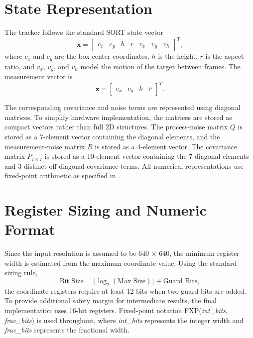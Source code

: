 \section{State Representation}
The tracker follows the standard SORT state vector
\begin{equation}
	\mathbf{x} = \begin{bmatrix}
		c_x & c_y & h & r & v_x & v_y & v_h
	\end{bmatrix}^{T},
\end{equation}
where \(c_x\) and \(c_y\) are the box center coordinates, \(h\) is the height, \(r\) is 
the aspect ratio, and \(v_x\), \(v_y\), and \(v_h\) model the motion of the target between 
frames. The measurement vector is
\begin{equation}
	\mathbf{z} = \begin{bmatrix}
		c_x & c_y & h & r
	\end{bmatrix}^{T}.
\end{equation}

The corresponding covariance and noise terms are represented using diagonal 
matrices. To simplify hardware implementation, the matrices are stored as compact 
vectors rather than full 2D structures. The process-noise matrix \(Q\) is stored as 
a 7-element vector containing the diagonal elements, and the measurement-noise matrix 
\(R\) is stored as a 4-element vector. The covariance matrix \(P_{7 \times 7}\) is stored 
as a 10-element vector containing the 7 diagonal elements and 3 distinct off-diagonal 
covariance terms. All numerical representations use fixed-point arithmetic as specified 
in .

\section{Register Sizing and Numeric Format}
\label{sec:register_sizing}
Since the input resolution is assumed to be 640 \(\times\) 640, the minimum register 
width is estimated from the maximum coordinate value. Using the standard sizing rule,
\begin{equation}
	\text{Bit Size} = \lceil \log_2(\text{Max Size}) \rceil + \text{Guard Bits},
\end{equation}
the coordinate registers require at least 12 bits when two guard bits are added. To 
provide additional safety margin for intermediate results, the final implementation 
uses 16-bit registers. Fixed-point notation FXP(\textit{int\_bits}, \textit{frac\_bits}) 
is used throughout, where \textit{int\_bits} represents the integer width and 
\textit{frac\_bits} represents the fractional width.

